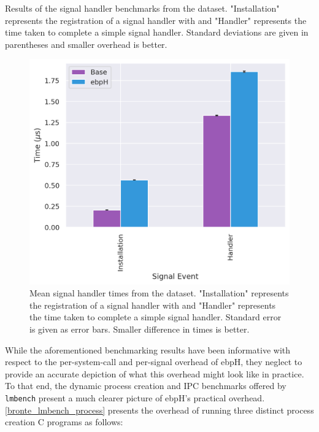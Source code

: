 \documentclass[
  12pt]{findlay}
\newcommand{\passthrough}[1]{#1}
\begin{document}
\begin{table}
    \caption[Results of the signal handler benchmarks from the  dataset]{
        Results of the signal handler benchmarks from the  dataset.
        "Installation" represents the registration of a signal handler with  and
        "Handler" represents the time taken to complete a simple signal handler.
        Standard deviations are given in parentheses and smaller overhead is better.
    }
    \label{bronte_lmbench_signal}
    
\end{table}

\begin{figure}
    \caption[Mean signal handler times from the  dataset]{
        Mean signal handler times from the  dataset.
        "Installation" represents the registration of a signal handler with  and
        "Handler" represents the time taken to complete a simple signal handler.
        Standard error is given as error bars.
        Smaller difference in times is better.
    }
    \label{bronte_lmbench_signal_graph}
    \includegraphics[width=.6\textwidth]{../data/bench/bronte-lmbench/signal_times.png}
\end{figure}

\FloatBarrier

While the aforementioned benchmarking results have been informative with
respect to the per-system-call and per-signal overhead of ebpH, they
neglect to provide an accurate depiction of what this overhead might
look like in practice. To that end, the dynamic process creation and IPC
benchmarks offered by \passthrough{\lstinline!lmbench!} present a much
clearer picture of ebpH's practical overhead.
\autoref{bronte_lmbench_process} presents the overhead of running three
distinct process creation C programs as follows:
\end{document}
